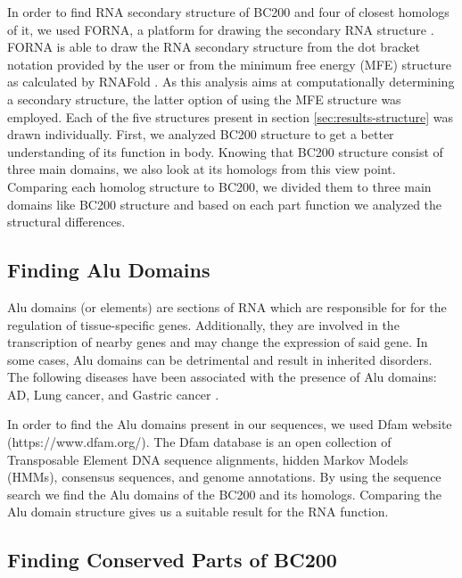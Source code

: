 \documentclass[conference, 11pt]{IEEEtran}
\begin{document}
In order to find RNA secondary structure of BC200 and four of closest homologs of it, we used FORNA, a platform for drawing the secondary RNA structure \cite{kerpedjiev2015forna}. 
FORNA is able to draw the RNA secondary structure from the dot bracket notation provided by the user or from the minimum free energy (MFE) structure as calculated by RNAFold \cite{lorenz2011viennarna}. 
As this analysis aims at computationally determining a secondary structure, the latter option of using the MFE structure was employed. 
Each of the five structures present in section \ref{sec:results-structure} was drawn individually. 
First, we analyzed BC200 structure to get a better understanding of its function in body. 
Knowing that BC200 structure consist of three main domains, we also look at its homologs from this view point. 
Comparing each homolog structure to BC200, we divided them to three main domains like BC200 structure and based on each part function we analyzed the structural differences.

\subsection{Finding Alu Domains}

Alu domains (or elements) are sections of RNA which are responsible for for the regulation of tissue-specific genes. Additionally, they are involved in the transcription of nearby genes and may change the expression of said gene. In some cases,  Alu domains can be detrimental and result in inherited disorders. The following diseases have been associated with the presence of Alu domains: AD, Lung cancer, and Gastric cancer \cite{tseng2013oxidative}.

In order to find the Alu domains present in our sequences, we used Dfam website (https://www.dfam.org/). 
The Dfam database is an open collection of Transposable Element DNA sequence alignments, hidden Markov Models (HMMs), consensus sequences, and genome annotations. 
By using the sequence search we find the Alu domains of the BC200 and its homologs. 
Comparing the Alu domain structure gives us a suitable result for the RNA function.

\subsection{Finding Conserved Parts of BC200}
\end{document}
